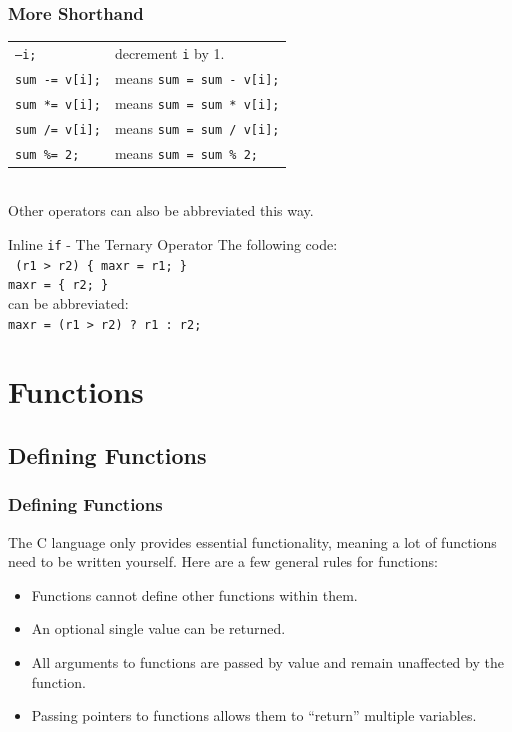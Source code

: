 \documentclass[smaller,table]{beamer}
\begin{document}
\begin{frame}
\frametitle{More Shorthand}
\begin{tabular}{l l}
\tt --i;&decrement {\tt i} by 1.\\
\tt sum -= v[i];&means {\tt sum = sum - v[i];}\\
\tt sum *= v[i];&means {\tt sum = sum * v[i];}\\
\tt sum /= v[i];&means {\tt sum = sum / v[i];}\\
\tt sum \%= 2;&means {\tt sum = sum \% 2;}
\end{tabular}\\
Other operators can also be abbreviated this way.
\begin{exampleblock}{Inline {\tt if} - The Ternary Operator}
The following code:\\
\texttt{ (r1 > r2) \{ maxr = r1; \}\\
 maxr = \{ r2; \} }\\
can be abbreviated:\\
\texttt{maxr = (r1 > r2) ? r1 : r2;}
\end{exampleblock}
\end{frame}



\section{Functions}

\subsection{Defining Functions}
\begin{frame}
\frametitle{Defining Functions}
The C language only provides essential functionality, meaning a lot of functions need to be written yourself. Here are a few general rules for functions:

\begin{itemize}
\item Functions cannot define other functions within them.
\item An optional single value can be returned.
\item All arguments to functions are passed by value and remain unaffected by the function.
\item Passing pointers to functions allows them to ``return'' multiple variables.
\end{itemize}
\end{frame}
\end{document}
